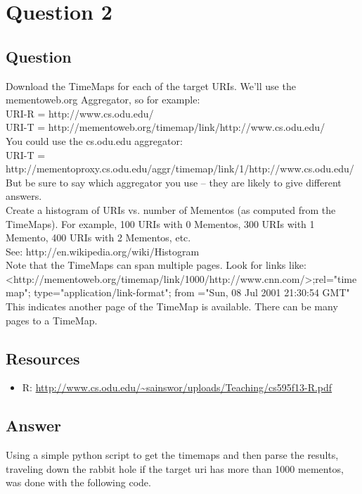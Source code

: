 \section{Question 2}

\subsection{Question}
Download the TimeMaps for each of the target URIs.  We'll use the mementoweb.org 
Aggregator, so for example:\\

URI-R = http://www.cs.odu.edu/\\

URI-T = http://mementoweb.org/timemap/link/http://www.cs.odu.edu/\\

You could use the cs.odu.edu aggregator:\\

URI-T = http://mementoproxy.cs.odu.edu/aggr/timemap/link/1/http://www.cs.odu.edu/\\

But be sure to say which aggregator you use -- they are likely to give
different answers.\\

Create a histogram of URIs vs. number of Mementos (as computed from
the TimeMaps).  For example, 100 URIs with 0 Mementos, 300 URIs
with 1 Memento, 400 URIs with 2 Mementos, etc.\\

See: http://en.wikipedia.org/wiki/Histogram\\

Note that the TimeMaps can span multiple pages.  Look for links like:\\

<http://mementoweb.org/timemap/link/1000/http://www.cnn.com/>;rel="timemap"; 
type="application/link-format"; from ="Sun, 08 Jul 2001 21:30:54 GMT"\\

This indicates another page of the TimeMap is available.  There can be 
many pages to a TimeMap.\\

\subsection{Resources}
\begin{itemize}
\item R: \url{http://www.cs.odu.edu/~sainswor/uploads/Teaching/cs595f13-R.pdf}
\end{itemize}

\subsection{Answer}
Using a simple python script to get the timemaps and then parse the results, traveling down the rabbit hole if the target uri has more than 1000 mementos, was done with the following code.

